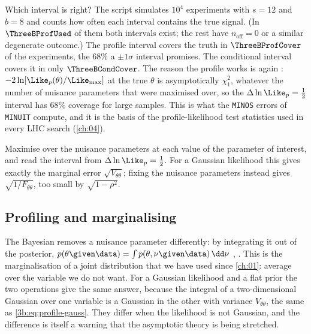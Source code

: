 Which interval is right? The script simulates $10^4$ experiments with
$s=12$ and $b=8$ and counts how often each interval contains the true
signal. (In $\ThreeBProfUsed$ of them both intervals exist; the rest have
$n_{\text{off}}=0$ or a similar degenerate outcome.) The profile interval
covers the truth in $\ThreeBProfCover$ of the experiments, the $68\%$ a
$\pm1\sigma$ interval promises. The conditional interval covers it in only
$\ThreeBCondCover$. The reason the profile works is  again \cite{Wilks1938}: $-2\ln[\Like_p(\theta)/\Like_{\max}]$ at the
true $\theta$ is asymptotically $\chi^2_1$, whatever the number of nuisance
parameters that were maximised over, so the $\Delta\ln\Like_p=\tfrac12$
interval has $68\%$ coverage for large samples. This is what the
\texttt{MINOS} errors of \texttt{MINUIT} compute, and it is the basis of the
profile-likelihood test statistics used in every LHC search (\cref{ch:04}).

\begin{keyidea}
Maximise over the nuisance parameters at each value of the parameter of
interest, and read the interval from $\Delta\ln\Like_p=\tfrac12$. For a
Gaussian likelihood this gives exactly the marginal error
$\sqrt{V_{\theta\theta}}$; fixing the nuisance parameters instead gives
$\sqrt{1/F_{\theta\theta}}$, too small by $\sqrt{1-\rho^2}$.
\end{keyidea}

\subsection{Profiling and marginalising}
\label{3b:sec:marginalise}

The Bayesian removes a nuisance parameter differently: by integrating it
out of the posterior, $p(\theta\given\data)=\int p(\theta,\nu\given\data)\,\dd\nu$
, . This is the
marginalisation of a joint distribution that we have used since
\cref{ch:01}: average over the variable we do not want. For a Gaussian
likelihood and a flat prior the two operations give the same answer,
because the integral of a two-dimensional Gaussian over one variable is a
Gaussian in the other with variance $V_{\theta\theta}$, the same as
\eqref{3b:eq:profile-gauss}. They differ when the likelihood is not
Gaussian, and the difference is itself a warning that the asymptotic
theory is being stretched.

